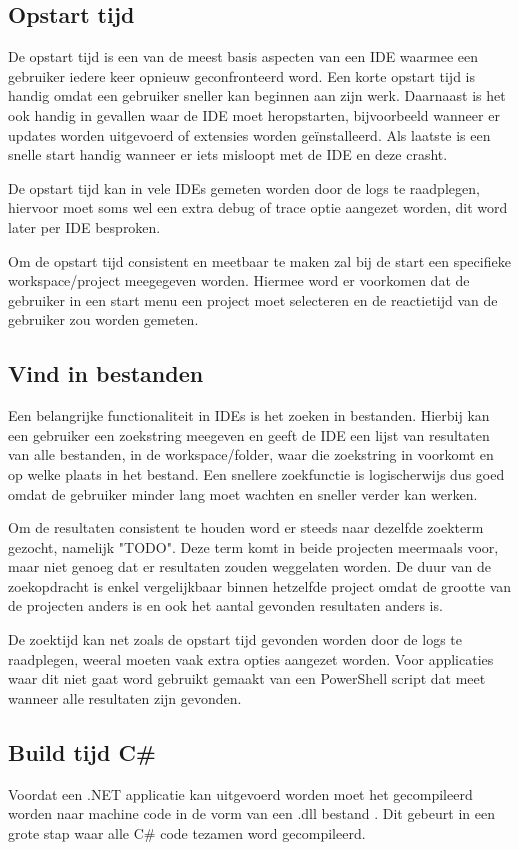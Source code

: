\subsection{Opstart tijd}
De opstart tijd is een van de meest basis aspecten van een IDE waarmee een gebruiker iedere keer opnieuw geconfronteerd word. Een korte opstart tijd is handig omdat een gebruiker sneller kan beginnen aan zijn werk. Daarnaast is het ook handig in gevallen waar de IDE moet heropstarten, bijvoorbeeld wanneer er updates worden uitgevoerd of extensies worden geïnstalleerd. Als laatste is een snelle start handig wanneer er iets misloopt met de IDE en deze crasht.

De opstart tijd kan in vele IDEs gemeten worden door de logs te raadplegen, hiervoor moet soms wel een extra debug of trace optie aangezet worden, dit word later per IDE besproken.

Om de opstart tijd consistent en meetbaar te maken zal bij de start een specifieke workspace/project meegegeven worden. Hiermee word er voorkomen dat de gebruiker in een start menu een project moet selecteren en de reactietijd van de gebruiker zou worden gemeten.

\subsection{Vind in bestanden}
Een belangrijke functionaliteit in IDEs is het zoeken in bestanden. Hierbij kan een gebruiker een zoekstring meegeven en geeft de IDE een lijst van resultaten van alle bestanden, in de workspace/folder, waar die zoekstring in voorkomt en op welke plaats in het bestand. Een snellere zoekfunctie is logischerwijs dus goed omdat de gebruiker minder lang moet wachten en sneller verder kan werken.

Om de resultaten consistent te houden word er steeds naar dezelfde zoekterm gezocht, namelijk "TODO". Deze term komt in beide projecten meermaals voor, maar niet genoeg dat er resultaten zouden weggelaten worden. De duur van de zoekopdracht is enkel vergelijkbaar binnen hetzelfde project omdat de grootte van de projecten anders is en ook het aantal gevonden resultaten anders is.

De zoektijd kan net zoals de opstart tijd gevonden worden door de logs te raadplegen, weeral moeten vaak extra opties aangezet worden. Voor applicaties waar dit niet gaat word gebruikt gemaakt van een PowerShell script dat meet wanneer alle resultaten zijn gevonden.

\subsection{Build tijd C\#}
Voordat een .NET applicatie kan uitgevoerd worden moet het gecompileerd worden naar machine code in de vorm van een .dll bestand \autocite{Yu2022}. Dit gebeurt in een grote stap waar alle C\# code tezamen word gecompileerd.

